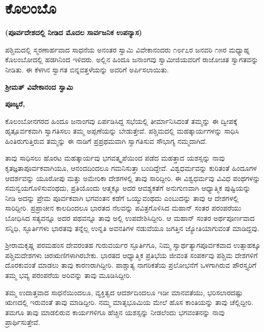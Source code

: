 
\chapter{ಕೊಲಂಬೊ}

\begin{center}
\textbf{(ಪೂರ್ವದೇಶದಲ್ಲಿ ನೀಡಿದ ಮೊದಲ ಸಾರ್ವಜನಿಕ ಉಪನ್ಯಾಸ)}
\end{center}

ಪಶ್ಚಿಮದಲ್ಲಿ ಸ್ಮರಣಾರ್ಹವಾದ ಸಾಧನೆಯ ಅನಂತರ ಸ್ವಾಮಿ ವಿವೇಕಾನಂದರು ೧೮೯೭ರ ಜನವರಿ ೧೫ರ ಮಧ್ಯಾಹ್ನ ಕೊಲಂಬೋದಲ್ಲಿ ಹಡಗಿನಿಂದ ಇಳಿದರು. ಅಲ್ಲಿನ ಹಿಂದೂ ಜನಾಂಗವು ಸ್ವಾಮೀಜಿಯವರಿಗೆ ರಾಜೋಚಿತ ಸ್ವಾಗತವನ್ನು ನೀಡಿತು. ಈ ಕೆಳಗಿನ ಸ್ವಾಗತ ಬಿನ್ನವತ್ತಳೆಯನ್ನು ಅವರಿಗೆ ಅರ್ಪಿಸಲಾಯಿತು.

\begin{center}
\textbf{ಶ‍್ರೀಮತ್​ ವಿವೇಕಾನಂದ ಸ್ವಾಮಿ}
\end{center}

\textbf{ಪೂಜ್ಯರೆ,}

ಕೊಲಂಬೋನಗರದ ಹಿಂದೂ ಜನಾಂಗವು ಏರ್ಪಡಿಸಿದ್ದ ಸಭೆಯಲ್ಲಿ ತೀರ್ಮಾನಿಸಿದಂತೆ ತಮ್ಮನ್ನು ಈ ದ್ವೀಪಕ್ಕೆ ಹೃತ್ಪೂರ್ವಕವಾಗಿ ಸ್ವಾಗತಿಸಲು ತಮ್ಮ ಅಪ್ಪಣೆಯನ್ನು ಬೇಡುತ್ತೇವೆ. ಪಶ್ಚಿಮದಲ್ಲಿ ಮಹತ್ಕಾರ್ಯಗಳನ್ನು ಸಾಧಿಸಿ ಹಿಂತಿರುಗುತ್ತಿರುವ ತಮ್ಮನ್ನು ಈ ನಾಡಿಗೆ ಪ್ರಪ್ರಥಮವಾಗಿ ಸ್ವಾಗತಿಸುವ ಸೌಭಾಗ್ಯ ನಮ್ಮದಾಗಿದೆ.

ತಾವು ಸಾಧಿಸಲು ಹೊರಟ ಮಹತ್ಕಾರ್ಯವು ಭಗವತ್ಕೃಪೆಯಿಂದ ಪಡೆದ ಮಹತ್ತಾದ ಯಶಸ್ಸನ್ನು ನಾವು ಕೃತಜ್ಞತಾಪೂರ್ವಕವಾಗಿಯೂ, ಆನಂದದಿಂದಲೂ ಗಮನಿಸುತ್ತಾ ಬಂದಿದ್ದೇವೆ. ವಿಶ್ವಧರ್ಮವನ್ನು ಕುರಿತಂತೆ ಹಿಂದೂಗಳ ಆದರ್ಶವನ್ನು ಯೂರೋಪು ಮತ್ತು ಅಮೇರಿಕಾ ದೇಶಗಳಲ್ಲಿ ತಾವು ಸಾರಿದ್ದೀರಿ. ಈ ವಿಶ್ವಧರ್ಮವು ವಿವಿಧ ಪಂಥಗಳನ್ನು ಸಮನ್ವಯಗೊಳಿಸುವಂಥದು, ಪ್ರತಿಯೊಂದು ಆತ್ಮಕ್ಕೂ ಅದರ ಆವಶ್ಯಕತೆಗೆ ಅನುಗುಣವಾಗಿ ಆಧ್ಯಾತ್ಮಿಕ ಪುಷ್ಟಿಯನ್ನು ನೀಡಿ ಅದನ್ನು ಪ್ರೇಮ ಪೂರ್ವಕವಾಗಿ ಭಗವಂತನ ಕಡೆಗೆ ಒಯ್ಯುವಂಥದು ಎಂಬುದನ್ನು ತಾವು ಆ ದೇಶಗಳಲ್ಲಿ ಸಾರಿದ್ದೀರಿ. ಪ್ರಪ್ರಾಚೀನ ಕಾಲದಿಂದಲೂ ಭಾರತದ ನೆಲವನ್ನು ಪವಿತ್ರಗೊಳಿಸಿದ ಮಹಾನ್​ ಸಂತರ ಪರಂಪರೆಯು ಬೋಧಿಸಿದ ಸತ್ಯವನ್ನೂ ಅದರ ಪಥವನ್ನೂ ತಾವು ಅಲ್ಲಿ ಉಪದೇಶಿಸಿದ್ದೀರಿ. ಆ ಮಹಾನ್​ ಸಂತರ ಅರ್ಥಪೂರ್ಣವಾದ ಸನ್ನಿಧಿ, ಸ್ಫೂರ್ತಿಗಳು ಭಾರತವು ತನ್ನೆಲ್ಲ ಉನ್ನತಿ ಅವನತಿಗಳ ನಡುವೆಯೂ ಜಗತ್ತಿನ ಜ್ಯೋತಿಯಾಗುವಂತೆ ಮಾಡಿದ್ದವು.

ಶ‍್ರೀರಾಮಕೃಷ್ಣ ಪರಮಹಂಸ ದೇವರಂತಹ ಗುರುವರ್ಯರ ಸ್ಫೂರ್ತಿಗೂ, ನಿಮ್ಮ ಸ್ವಾರ್ಥತ್ಯಾಗಪೂರ್ವಕವಾದ ಉತ್ಸಾಹಕ್ಕೂ ಪಶ್ಚಿಮದೇಶಗಳು ಚಿರಋಣಿಗಳಾಗಿರಬೇಕು. ಭಾರತದ ಆಧ್ಯಾತ್ಮಿಕ ಪ್ರತಿಭೆಯ ಜೀವಂತ ಸಂಪರ್ಕವು ಪಶ್ಚಿಮ ದೇಶಗಳಿಗೆ ದೊರಕುವಂತೆ ಮಾಡಲು ತಾವು ಕಾರಣರಾಗಿದ್ದೀರಿ. ಪಾಶ್ಚಾತ್ಯ ನಾಗರಿಕತೆಯ ಪ್ರಲೋಭನೆಗೆ ಒಳಗಾಗಿರುವ ಪೌರಸ್ತ್ಯರಿಗೆ ತಮ್ಮ ಭವ್ಯ ಪರಂಪರೆಯ ಅರಿವನ್ನು ತಾವು ಮೂಡಿಸಿದ್ದೀರಿ.

ತಮ್ಮ ಉದಾತ್ತವಾದ ಸಾಧನೆಯಿಂದಲೂ, ವ್ಯಕ್ತಿತ್ವದ ಆದರ್ಶದಿಂದಲೂ ಇಡೀ ಮಾನವತೆಯು, ಭರಿಸಲಾರದಷ್ಟು ಋಣದಲ್ಲಿ ಇರುವಂತೆ ತಾವು ಮಾಡಿದ್ದೀರಿ. ನಮ್ಮ ಮಾತೃಭೂಮಿಯ ಮೇಲೆ ಹೊಸ ಕಾಂತಿಯನ್ನು ತಾವು ಚೆಲ್ಲಿದ್ದೀರಿ. ತಮಗೂ ತಾವು ಮಾಡಲಿರುವ ಕಾರ್ಯಗಳಿಗೂ ಹೆಚ್ಚಿನ ಯಶಸ್ಸನ್ನು ನೀಡಲೆಂದು ಭಗವಂತನನ್ನು ನಾವು ಪ್ರಾರ್ಥಿಸುತ್ತೇವೆ.

